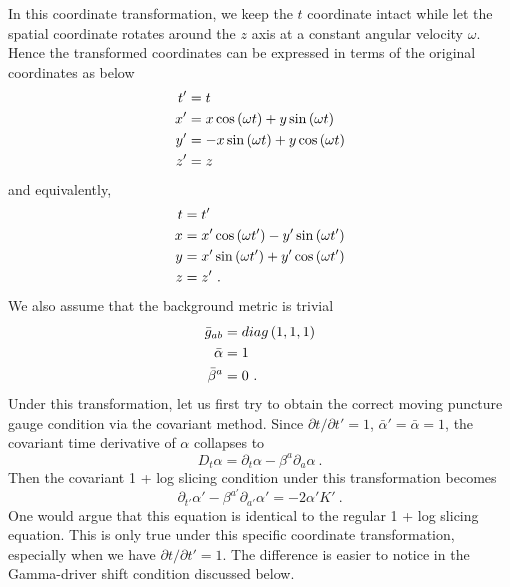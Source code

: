 In this coordinate transformation, we keep the $t$ coordinate intact while let the spatial coordinate rotates around the $z$ axis at a constant angular velocity $\omega$. Hence the transformed coordinates can be expressed in terms of the original coordinates as below
\begin{subequations}
\begin{align}
t' & = t\notag\\
x' & = x \cos\left(\omega t\right) + y\sin\left(\omega t\right)\notag\\
y' & = -x\sin\left(\omega t\right) + y\cos\left(\omega t\right)\notag\\
z' & = z
\end{align}
\end{subequations}
and equivalently, 
\begin{subequations}
\begin{align}
t & = t'\notag\\
x & = x'\cos\left(\omega t'\right) - y'\sin\left(\omega t'\right)\notag\\
y & = x'\sin\left(\omega t'\right) + y'\cos\left(\omega t'\right)\notag\\
z & = z' \ .
\end{align}
\end{subequations}
We also assume that the background metric is trivial
\begin{align}
{\bar g}_{ab} & = diag\left(1,1,1\right)\notag\\
{\bar \alpha} & = 1\notag\\
{\bar \beta}^{a} & = 0 \ . 
\end{align}
Under this transformation, let us first try to obtain the correct moving puncture gauge condition via the covariant method. Since $\partial t/\partial t' = 1$, ${\bar \alpha}' = {\bar \alpha} = 1$, the covariant time derivative of $\alpha$ collapses to
\begin{equation}
D_{t}\alpha = \partial_{t}\alpha - \beta^{a}\partial_{a}\alpha \ .
\end{equation}
Then the covariant 1 + log slicing condition under this transformation becomes
\begin{equation}\label{transformed1+logslicing}
\partial_{t'}\alpha' - \beta^{a'}\partial_{a'}\alpha' = -2\alpha'K' \ .
\end{equation}
One would argue that this equation is identical to the regular 1 + log slicing equation. This is only true under this specific coordinate transformation, especially when we have $\partial t/\partial t' = 1$. The difference is easier to notice in the Gamma-driver shift condition discussed below. 

